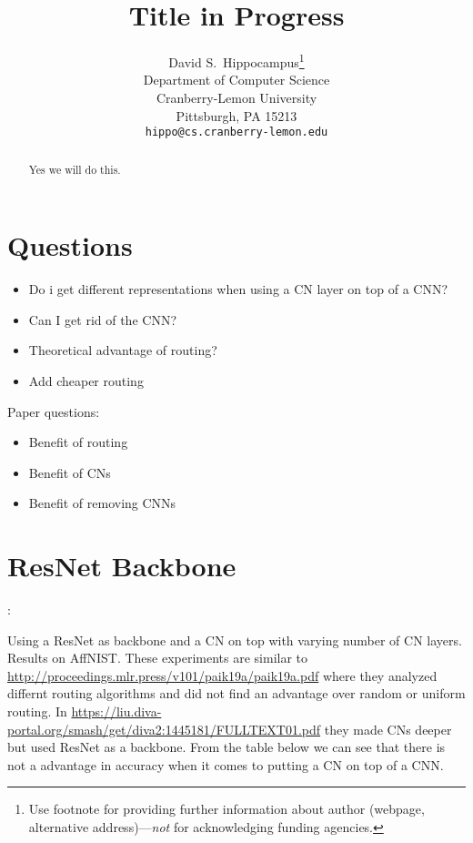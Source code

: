 \documentclass{article}
\title{Title in Progress}
\author{%
  David S.~Hippocampus\thanks{Use footnote for providing further information
    about author (webpage, alternative address)---\emph{not} for acknowledging
    funding agencies.} \\
  Department of Computer Science\\
  Cranberry-Lemon University\\
  Pittsburgh, PA 15213 \\
  \texttt{hippo@cs.cranberry-lemon.edu} \\
}
\begin{document}
\maketitle

\begin{abstract}
  Yes we will do this.
\end{abstract}

\section{Questions}
\begin{itemize}
	\item Do i get different representations when using a CN layer on top of a CNN?
	\item Can I get rid of the CNN?
	\item Theoretical advantage of routing?
	\item Add cheaper routing
\end{itemize}

Paper questions:
\begin{itemize}
	\item Benefit of routing
	\item Benefit of CNs
	\item Benefit of removing CNNs
\end{itemize}

\section{ResNet Backbone}:

Using a ResNet as backbone and a CN on top with varying number of CN layers. Results on AffNIST. These experiments are similar to \url{http://proceedings.mlr.press/v101/paik19a/paik19a.pdf}  where they analyzed differnt routing algorithms and did not find an advantage over random or uniform routing.
In \url{https://liu.diva-portal.org/smash/get/diva2:1445181/FULLTEXT01.pdf} they made CNs deeper but used ResNet as a backbone. From the table below we can see that there is not a advantage in accuracy when it comes to putting a CN on top of a CNN.
\end{document}
